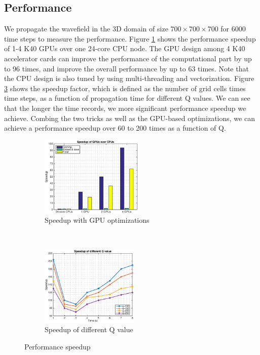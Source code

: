 \documentclass{paris17}
\begin{document}
\subsection{Performance}

We propagate the wavefield in the 3D domain of size $700\times700\times700$ for 6000 time steps to measure the performance. Figure \ref{fig:gpu-speedup} shows the performance speedup of 1-4 K40 GPUs over one 24-core CPU node. The GPU design among 4 K40 accelerator cards can improve the performance of the computational part by up to 96 times, and improve the overall performance by up to 63 times. Note that the CPU design is also tuned by using multi-threading and vectorization. Figure \ref{fig:q-speedup} shows the speedup factor, which is  defined as the number of grid cells times time steps, as a function of propagation time for different Q values. We can see that the longer the time records, we more significant performance speedup we achieve.  Combing the two tricks as well as the GPU-based optimizations, we can achieve a performance speedup over 60 to 200 times as a function of Q.

\begin{figure}[h]
    \centering
    \begin{subfigure}[b]{0.4\textwidth}
        \centering
        \includegraphics[height=1.5in]{./fig/speedup.eps}
        \caption{Speedup with GPU optimizations}
        \label{fig:gpu-speedup}
    \end{subfigure}%
    ~
    \begin{subfigure}[b]{0.4\textwidth}
        \centering
        \includegraphics[height=1.5in]{./fig/speedup_q.eps}
        \caption{Speedup of different Q value}
        \label{fig:q-speedup}
    \end{subfigure}
    \caption{Performance speedup}
\end{figure}
\end{document}
